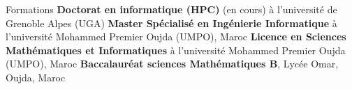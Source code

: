 \begin{rubric}{Formations}
\entry*[]%
    \textbf{Doctorat en informatique (HPC)} (en cours) à l'université de Grenoble Alpes (UGA)
        \hfill {}
%
\entry*[]%
    \textbf{Master Spécialisé en Ingénierie Informatique} à l'université Mohammed Premier Oujda (UMPO), Maroc
    \hfill {}
%
\entry*[]%
    \textbf{Licence en Sciences Mathématiques et Informatiques} à l'université Mohammed Premier Oujda (UMPO), Maroc
        \hfill {}
%
%
\entry*[]%
    \textbf{Baccalauréat sciences Mathématiques B}, Lycée Omar, Oujda, Maroc
        \hfill {}
\end{rubric}
